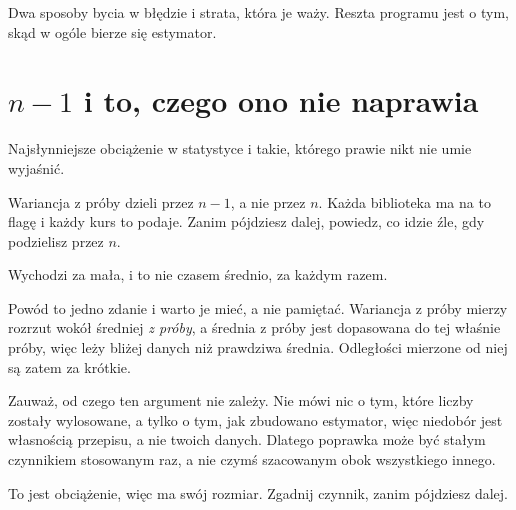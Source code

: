 \begin{fr}

Dwa sposoby bycia w błędzie i strata, która je waży. Reszta programu jest o
tym, skąd w ogóle bierze się estymator.
\end{fr}

\section{$n-1$ i to, czego ono nie naprawia}
\label{sec:P26-n-minus-one}

\begin{fr}
Najsłynniejsze obciążenie w statystyce i takie, którego prawie nikt nie umie
wyjaśnić.

Wariancja z próby dzieli przez $n-1$, a nie przez $n$. Każda biblioteka ma na
to flagę i każdy kurs to podaje. Zanim pójdziesz dalej, powiedz, co idzie
źle, gdy podzielisz przez $n$.
\dotline
\nextframe
\end{fr}

\begin{fr}
\begin{ansblock}
Wychodzi za mała, i to nie czasem \dash{} średnio, za każdym razem.
\end{ansblock}

Powód to jedno zdanie i warto je mieć, a nie pamiętać. Wariancja z próby
mierzy rozrzut wokół średniej \emph{z próby}, a średnia z próby jest
dopasowana do tej właśnie próby, więc leży bliżej danych niż prawdziwa
średnia. Odległości mierzone od niej są zatem za krótkie.

Zauważ, od czego ten argument nie zależy. Nie mówi nic o tym, które liczby
zostały wylosowane, a tylko o tym, jak zbudowano estymator, więc niedobór
jest własnością przepisu, a nie twoich danych. Dlatego poprawka może być
stałym czynnikiem stosowanym raz, a nie czymś szacowanym obok wszystkiego
innego.

To jest obciążenie, więc ma swój rozmiar. Zgadnij czynnik, zanim pójdziesz
dalej.
\dotline
\nextframe
\end{fr}

